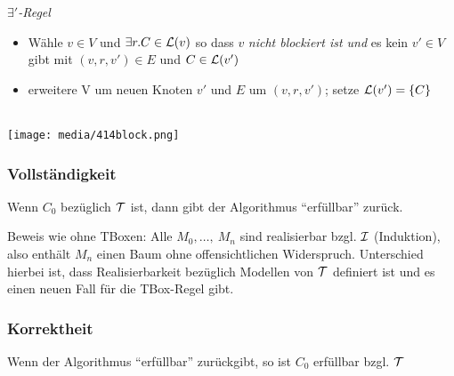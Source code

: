 \emph{$\exists'$-Regel}
\begin{itemize}
\item
  Wähle $v \in V$ und $\exists r.C \in \ML\left( v \right)$ so dass
  $v$ \emph{nicht blockiert ist und} es kein $v' \in V$ gibt mit
  $\left( v,r,v' \right) \in E$ und $C \in \ML\left( v' \right)$
\item
  erweitere V um neuen Knoten $v'$ und $E$ um
  $\left( v,r,v' \right)$; setze
  $\ML\left( v' \right) = \left\{ C \right\}$
\end{itemize}

\begin{tafel}\mbox{}\\

\texttt{[image: media/414block.png]}

\end{tafel}

\subsubsection{Vollständigkeit}\label{vollstuxe4ndigkeit}

\begin{theorem}
    Wenn $C_0$ bezüglich $\mathcal{T}$ ist, dann gibt der Algorithmus \enquote{erfüllbar} zurück.
\end{theorem}

Beweis wie ohne TBoxen: Alle $M_{0},\ldots,\ M_{n}$ sind realisierbar
bzgl. $\mathcal{I}$ (Induktion), also enthält $M_{n}$ einen Baum ohne
offensichtlichen Widerspruch. Unterschied hierbei ist, dass Realisierbarkeit bezüglich Modellen von $\mathcal{T}$ definiert ist und es einen neuen Fall für die TBox-Regel gibt.

\subsubsection{Korrektheit}\label{korrektheit}

\begin{theorem}
    Wenn der Algorithmus \enquote{erfüllbar} zurückgibt, so ist $C_0$ erfüllbar bzgl. $\mathcal{T}$
\end{theorem}

